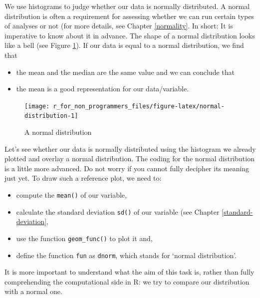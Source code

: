 \documentclass[
]{book}
\begin{document}
We use histograms to judge whether our data is normally distributed. A normal distribution is often a requirement for assessing whether we can run certain types of analyses or not (for more details, see Chapter \ref{normality}. In short: It is imperative to know about it in advance. The shape of a normal distribution looks like a bell (see Figure \ref{fig:normal-distribution}). If our data is equal to a normal distribution, we find that

\begin{itemize}
\item
  the mean and the median are the same value and we can conclude that
\item
  the mean is a good representation for our data/variable.
\end{itemize}

\begin{figure}

{\centering \texttt{[image: r\_for\_non\_programmers\_files/figure-latex/normal-distribution-1]} 

}

\caption{A normal distribution}\label{fig:normal-distribution}
\end{figure}

Let's see whether our data is normally distributed using the histogram we already plotted and overlay a normal distribution. The coding for the normal distribution is a little more advanced. Do not worry if you cannot fully decipher its meaning just yet. To draw such a reference plot, we need to:

\begin{itemize}
\item
  compute the \texttt{mean()} of our variable,
\item
  calculate the standard deviation \texttt{sd()} of our variable (see Chapter \ref{standard-deviation},
\item
  use the function \texttt{geom\_func()} to plot it and,
\item
  define the function \texttt{fun} as \texttt{dnorm}, which stands for `normal distribution'.
\end{itemize}

It is more important to understand what the aim of this task is, rather than fully comprehending the computational side in R: we try to compare our distribution with a normal one.
\end{document}
